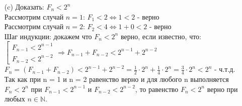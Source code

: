 \documentclass[a4paper]{article}
\renewcommand{\f}[2]{\frac{#1}{#2}}
\newcommand{\NN}{\mathbb{N}}
\begin{document}
\begin{enumerate}
\begin{enumerate}
        \item[(c)] Доказать: $F_n < 2^n$\\
        Рассмотрим случай $n=1$: $F_1 < 2 \Leftrightarrow 1 < 2$ - верно \\
        Рассмотрим случай $n=2$: $F_2 < 4 \Leftrightarrow 1+0 < 2$ - верно \\
        Шаг индукции: докажем что $F_n < 2^n$ верно, если известно, что: \\
        $\left[ 
        \begin{gathered}
            F_{n-1} < 2^{n-1} \\
            F_{n-2} < 2^{n-2}
        \end{gathered}
        \right. \Rightarrow F_{n-1}+F_{n-2} < 2^{n-1}+2^{n-2}$\\
        $F_n = (F_{n-1}+F_{n-2}) < 2^{n-1}+2^{n-2} = \f{1}{2}\cdot 2^n + \f{1}{4}\cdot 2^n = \f{3}{4}\cdot 2^n < 2^n$ - ч.т.д.\\
        Так как при n = 1 и n = 2 равенство верно и для любого n выполняется $F_n < 2^n$ при $F_{n-1} < 2^{n-1}$ и $F_{n-2} < 2^{n-2}$, то равенство $F_n < 2^n$ верно при любых $n \in \NN$.\\


    \end{enumerate}
\end{enumerate}
\end{document}
